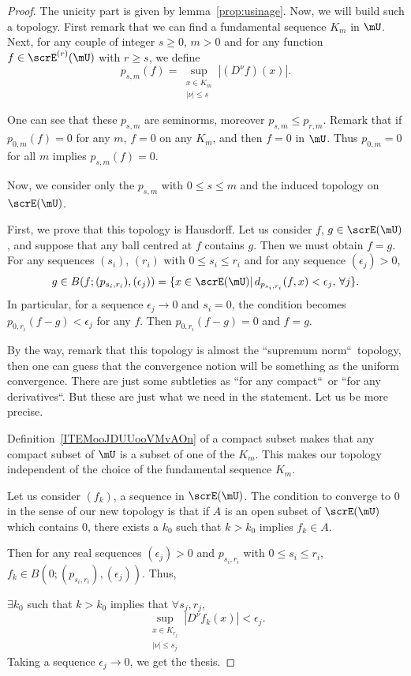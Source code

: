 \begin{proof}
	The unicity part is given by lemma~\ref{prop:usinage}. Now, we will build such a topology. First remark that we can find a fundamental sequence $K_m$ in $\mU$. Next, for any couple of integer $s\geq 0$, $m>0$ and for any function $f\in\scrE^{(r)}(\mU)$ with $r\geq s$, we define
	\[
		p_{s,m}(f)=\sup_{\substack{ x\in K_m\\|\nu|\leq s}}|(D^{\nu}f)(x)|.
	\]

	One can see that these $p_{s,m}$ are seminorms, moreover $p_{s,m}\leq p_{r,m}$. Remark that if $p_{0,m}(f)=0$ for any $m$, $f=0$ on any $K_m$, and then $f=0$ in $\mU$. Thus $p_{0,m}=0$ for all $m$ implies $p_{s,m}(f)=0$.

	Now, we consider only the $p_{s,m}$ with $0\leq s\leq m$ and the induced topology on $\scrE(\mU)$.

	First, we prove that this topology is Hausdorff. Let us consider $f$, $g\in\scrE(\mU)$, and suppose that any ball centred at $f$ contains $g$. Then we must obtain $f=g$. For any sequences $(s_i)$, $(r_i)$ with $0\leq s_i\leq r_i$ and for any sequence $(\epsilon_j)>0$,
	\[
		g\in B(f;(p_{s_i,r_i}),(\epsilon_j))=
		\{ x\in\scrE(\mU)|\, d_{p_{s_i,r_i}}(f,x)<\epsilon_j,\,\forall j \}.
	\]
	In particular, for a sequence $\epsilon_j\to 0$ and $s_i=0$, the condition becomes $p_{0,r_i}(f-g)<\epsilon_j$ for any $f$. Then $p_{0,r_i}(f-g)=0$ and $f=g$.

	By the way, remark that this topology is almost the ``supremum norm``\ topology, then one can guess that the convergence notion will be something as the uniform convergence. There are just some subtleties as ``for any compact``\ or ``for any derivatives``. But these are just what we need in the statement. Let us be more precise.

	Definition~\ref{ITEMooJDUUooVMvAOn} of a compact subset makes that any compact subset of $\mU$ is a subset of one of the $K_m$. This makes our topology independent of the choice of the fundamental sequence $K_m$.

	Let us consider $(f_k)$, a sequence in $\scrE(\mU)$. The condition to converge to $0$ in the sense of our new topology is that if $A$ is an open subset of $\scrE(\mU)$ which contains $0$, there exists a $k_0$ such that $k>k_0$ implies $f_k\in A$.

	Then for any real sequences $(\epsilon_j)>0$ and $p_{s_i,r_i}$ with $0\leq s_i\leq r_i$, $f_k\in B( 0;(p_{s_i,r_i}),(\epsilon_j) )$. Thus,

	$\exists k_0$ such that $k>k_0$ implies that $\forall s_j,r_j$,
	\[
		\sup_{ \substack{ x\in K_{r_j}\\|\nu|\leq s_j } }|D^{\nu}f_k(x)|<\epsilon_j.
	\]
	Taking a sequence $\epsilon_j\to 0$, we get the thesis.
\end{proof}


